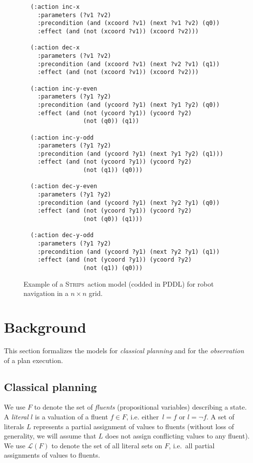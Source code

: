 \documentclass[letterpaper]{article} %
\newcommand{\strips}{\textsc{Strips}}     %
\begin{document}
\begin{figure}
  \begin{tiny}
  \begin{verbatim}
  (:action inc-x
    :parameters (?v1 ?v2)
    :precondition (and (xcoord ?v1) (next ?v1 ?v2) (q0))
    :effect (and (not (xcoord ?v1)) (xcoord ?v2)))

  (:action dec-x
    :parameters (?v1 ?v2)
    :precondition (and (xcoord ?v1) (next ?v2 ?v1) (q1))
    :effect (and (not (xcoord ?v1)) (xcoord ?v2)))

  (:action inc-y-even
    :parameters (?y1 ?y2)
    :precondition (and (ycoord ?y1) (next ?y1 ?y2) (q0))
    :effect (and (not (ycoord ?y1)) (ycoord ?y2)
                 (not (q0)) (q1))

  (:action inc-y-odd
    :parameters (?y1 ?y2)
    :precondition (and (ycoord ?y1) (next ?y1 ?y2) (q1)))
    :effect (and (not (ycoord ?y1)) (ycoord ?y2)
                 (not (q1)) (q0)))

  (:action dec-y-even
    :parameters (?y1 ?y2)
    :precondition (and (ycoord ?y1) (next ?y2 ?y1) (q0))
    :effect (and (not (ycoord ?y1)) (ycoord ?y2)
                 (not (q0)) (q1)))

  (:action dec-y-odd
    :parameters (?y1 ?y2)
    :precondition (and (ycoord ?y1) (next ?y2 ?y1) (q1))
    :effect (and (not (ycoord ?y1)) (ycoord ?y2)
                 (not (q1)) (q0)))
  \end{verbatim}           
  \end{tiny}  
 \caption{\small Example of a \strips\ action model (codded in PDDL) for robot navigation in a $n\times n$ grid.}
\label{fig:model-example}
\end{figure}



\section{Background}
\label{sec:background}
This section formalizes the models for {\em classical planning} and for the {\em observation} of a plan execution.

\subsection{Classical planning}
We use $F$ to denote the set of {\em fluents} (propositional variables) describing a state. A {\em literal} $l$ is a valuation of a fluent $f\in F$, i.e. either~$l=f$ or $l=\neg f$. A set of literals $L$ represents a partial assignment of values to fluents (without loss of generality, we will assume that $L$ does not assign conflicting values to any fluent). We use $\mathcal{L}(F)$ to denote the set of all literal sets on $F$, i.e.~all partial assignments of values to fluents.
\end{document}
